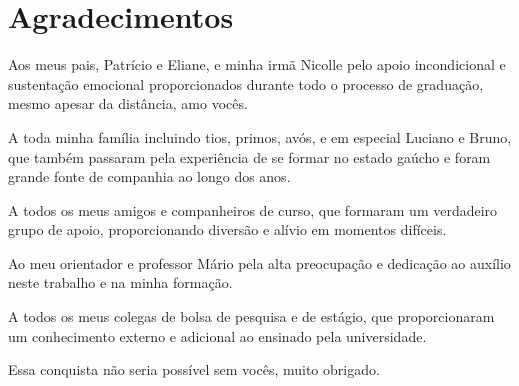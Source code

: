 \documentclass[repeatfields,xlists,xpacks,oneside,yearsonly]{ufrgscca}
\begin{document}
\maketitle
\notoc\chapter{Agradecimentos}

Aos meus pais, Patrício e Eliane, e minha irmã Nicolle pelo apoio incondicional e sustentação emocional proporcionados durante todo o processo de graduação, mesmo apesar da distância, amo vocês.

A toda minha família incluindo tios, primos, avós, e em especial Luciano e Bruno, que também passaram pela experiência de se formar no estado gaúcho e foram grande fonte de companhia ao longo dos anos.

A todos os meus amigos e companheiros de curso, que formaram um verdadeiro grupo de apoio, proporcionando diversão e alívio em momentos difíceis.

Ao meu orientador e professor Mário pela alta preocupação e dedicação ao auxílio neste trabalho e na minha formação.

A todos os meus colegas de bolsa de pesquisa e de estágio, que proporcionaram um conhecimento externo e adicional ao ensinado pela universidade.

Essa conquista não seria possível sem vocês, muito obrigado. 
\end{document}
